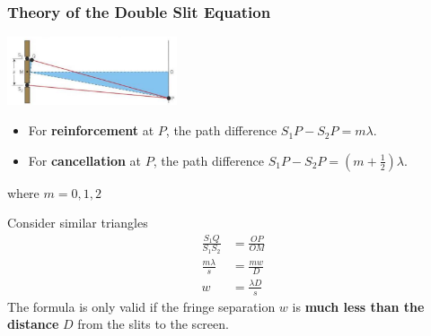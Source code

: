 \subsubsection*{Theory of the Double Slit Equation}

\begin{center}
    \includegraphics[width=5cm]{img/slits}
\end{center}

\begin{itemize}
    \item For \textbf{reinforcement} at $P$, the path difference $S_1P-S_2P=m\lambda$.
    \item For \textbf{cancellation} at $P$, the path difference $S_1P-S_2P=\left(m+\frac{1}{2}\right)\lambda$.
\end{itemize}
where $m=0,1,2$

Consider similar triangles
\begin{align*}
    \frac{S_1Q}{S_1S_2}&=\frac{OP}{OM}\\
    \frac{m\lambda}{s}&=\frac{mw}{D}\\
    w&=\frac{\lambda D}{s}
\end{align*}
The formula is only valid if the fringe separation $w$ is \textbf{much less than the distance} $D$ from the slits to the screen.
